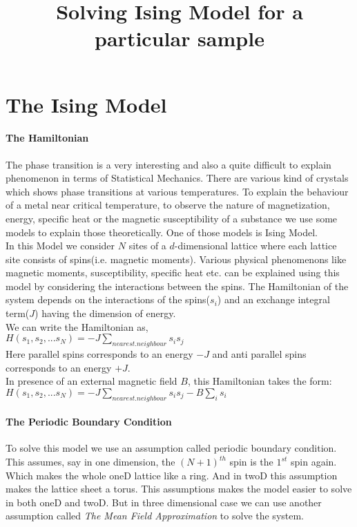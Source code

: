\documentclass[20pt]{article}
\begin{document}
\title{{\LARGE \textbf{Solving Ising Model for a particular sample}}}
\author{}
\date{}
\maketitle
\section*{The Ising Model}
\paragraph*{The Hamiltonian\\}
The phase transition is a very interesting and also a quite difficult to explain phenomenon in terms of Statistical Mechanics. There are various kind of crystals which shows phase transitions at various temperatures. To explain the behaviour of a metal near critical temperature, to observe the nature of magnetization, energy, specific heat or the magnetic susceptibility of a substance we use some models to explain those theoretically. One of those models is Ising Model.\\
In this Model we consider $N$ sites of a $d$-dimensional lattice where each lattice site consists of spins(i.e. magnetic moments). Various physical phenomenons like magnetic moments, susceptibility, specific heat etc. can be explained using this model by considering the interactions between the spins. The Hamiltonian of the system depends on the interactions of the spins($s_i$) and an exchange integral term($J$) having the dimension of energy.\\
We can write the Hamiltonian as,\\


$H(s_1,s_2,...s_N)=-J \sum_{nearest.neighbour} s_i s_j$ \\


Here parallel spins corresponds to an energy $-J$ and anti parallel spins corresponds to an energy $+J$.\\
In presence of an external magnetic field $B$, this Hamiltonian takes the form:\\

$H(s_1,s_2,...s_N)=-J \sum_{nearest.neighbour} s_i s_j - B \sum_{i} s_i$

\paragraph{The Periodic Boundary Condition \\}
To solve this model we use an assumption called periodic boundary condition. This assumes, say in one dimension, the $(N+1)^{th}$ spin is the $1^{st}$ spin again. Which makes the whole oneD lattice like a ring. And in twoD this assumption makes the  lattice sheet a torus. This assumptions makes the model easier to solve in both oneD and twoD. But in three dimensional case we can use another assumption called \textit{The Mean Field Approximation } to solve the system.
\end{document}
